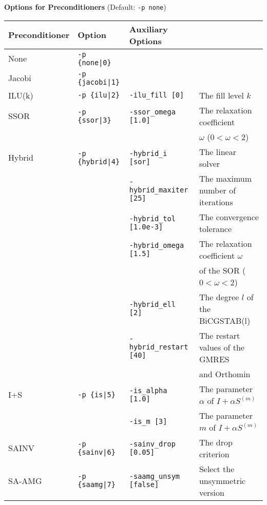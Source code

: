 \documentclass[a4paper]{article}
\begin{document}
\\ \\
\begin{minipage}[t]{\textwidth}
\begin{center}
{\bf Options for Preconditioners} (Default: \verb=-p none=)\\
\begin{tabular}{l|lll}\hline\hline
Preconditioner   & Option           & Auxiliary Options \\ \hline
None     & \verb=-p {none|0}=    &   \\
Jacobi   & \verb=-p {jacobi|1}=  &     \\
ILU(k)   & \verb=-p {ilu|2}=     & \verb=-ilu_fill [0]=        & The fill level $k$ \\
SSOR     & \verb=-p {ssor|3}=    & \verb=-ssor_omega [1.0]=    & The relaxation coefficient \\
         &                       &                             & $\omega$ ($0<\omega<2$) \\
Hybrid   & \verb=-p {hybrid|4}=  & \verb=-hybrid_i [sor]=      & The linear solver\\
         &                       & \verb=-hybrid_maxiter [25]= & The maximum number of iterations \\
         &                       & \verb=-hybrid_tol [1.0e-3]= & The convergence tolerance \\
         &                       & \verb=-hybrid_omega [1.5]=  & The relaxation coefficient $\omega$ \\
         &                       &                             & of the SOR ($0<\omega<2$) \\
         &                       & \verb=-hybrid_ell [2]=      & The degree $l$ of the BiCGSTAB(l) \\
         &                       & \verb=-hybrid_restart [40]= & The restart values of the GMRES \\
         &                       &                             & and Orthomin \\
I+S      & \verb=-p {is|5}=      & \verb=-is_alpha [1.0]=      & The parameter $\alpha$ of $I+\alpha S^{(m)}$ \\
         &                       & \verb=-is_m [3]=            & The parameter $m$ of $I+\alpha S^{(m)}$ \\
SAINV    & \verb=-p {sainv|6}=   & \verb=-sainv_drop [0.05]=   & The drop criterion\\
SA-AMG   & \verb=-p {saamg|7}=   & \verb=-saamg_unsym [false]= & Select the unsymmetric version    \\

\end{tabular}
\end{center}
\end{minipage}
\end{document}

